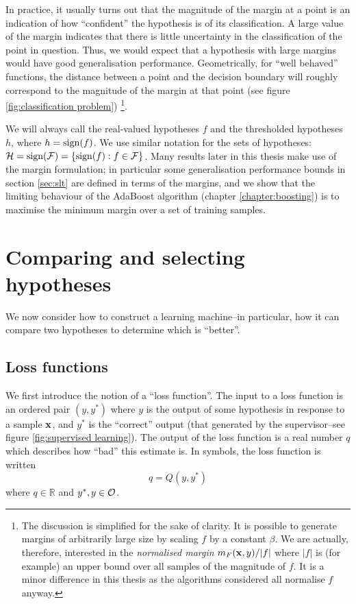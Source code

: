 In practice, it usually turns out that the magnitude of the margin at
a point is an indication of how ``confident'' the hypothesis is
of its classification.  A large value of the margin indicates that
there is little uncertainty in the classification of the point in
question.  Thus, we would expect that a hypothesis with large margins
would have good generalisation performance.  Geometrically, for ``well
behaved'' functions, the distance between a point and the decision
boundary will roughly correspond to the magnitude of the margin at
that point (see figure \ref{fig:classification problem})%
\footnote{The discussion is simplified for the sake of clarity.
It is possible to generate margins of arbitrarily large size by
scaling $f$ by a constant $\beta$.  We are actually, therefore,
interested in the \emph{normalised margin} $m_F(\mathbf{x}, y)/|f|$ where
$|f|$ is (for example) an upper bound over all samples of the
magnitude of $f$.  It is a minor difference in this thesis as the
algorithms considered all normalise $f$ anyway.}.

We will always call the real-valued hypotheses $f$ and the
thresholded hypotheses $h$, where $h = \mathrm{sign}(f)$.  We use similar
notation for the sets of hypotheses: $\mathcal{H} = \mathrm{sign}(\mathcal{F}) = \{
 \mathrm{sign}(f) : f \in \mathcal{F} \}$.  Many results later in this thesis make
use of the margin formulation; in particular some generalisation
performance bounds in section \ref{sec:slt} are defined in terms of
the margins, and we show that the limiting behaviour of the AdaBoost
algorithm (chapter \ref{chapter:boosting}) is to maximise the minimum
margin over a set of training samples.

\section{Comparing and selecting hypotheses}
\label{sec:comparing and selecting}

We now consider how to construct a learning machine--in particular,
how it can compare two hypotheses to determine which is ``better''.

\subsection{Loss functions}
\label{sec:loss function}

We first introduce the notion of a ``loss function''.  The input to a
loss function is an ordered pair $(y, y^{\ast})$ where $y$ is the
output of some hypothesis in response to a sample $\mathbf{x}$, and $y^{\ast}$
is the ``correct'' output (that generated by the supervisor--see
figure \ref{fig:supervised learning}).  The output of the loss
function is a real number $q$ which describes how ``bad'' this estimate is.
In symbols, the loss function is written 
%
\begin{equation}
q = Q(y, y^{\ast})
\end{equation}
%
where $q \in \mathbb{R}$ and $y^{\ast}, y \in \mathcal{O}$.

